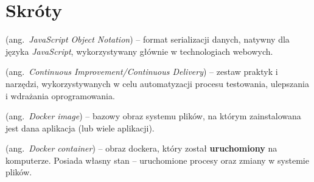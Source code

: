 \chapter*{Skróty}\mbox{}
\label{sec:skroty}
\noindent
\begin{description}[labelwidth=*]
  \item [JSON] (ang.\ \emph{JavaScript Object Notation}) %
      -- format serializacji danych, natywny dla języka \mbox{\textit{JavaScript}},
      wykorzystywany głównie w technologiach webowych.
  \item [CI/CD] (ang.\ \emph{Continuous Improvement/Continuous Delivery})
      -- zestaw praktyk i narzędzi, wykorzystywanych w celu automatyzacji procesu
      testowania, ulepszania i wdrażania oprogramowania.
  \item [Obraz dockera] (ang.\ \emph{Docker image}) -- bazowy obraz systemu plików,
        na którym zainstalowana jest dana aplikacja (lub wiele aplikacji).
  \item [Kontener dockera] (ang.\ \emph{Docker container}) -- obraz dockera,
        który został \textbf{uruchomiony} na komputerze. Posiada własny stan -- 
        uruchomione procesy oraz zmiany w systemie \mbox{plików}.
\end{description}
